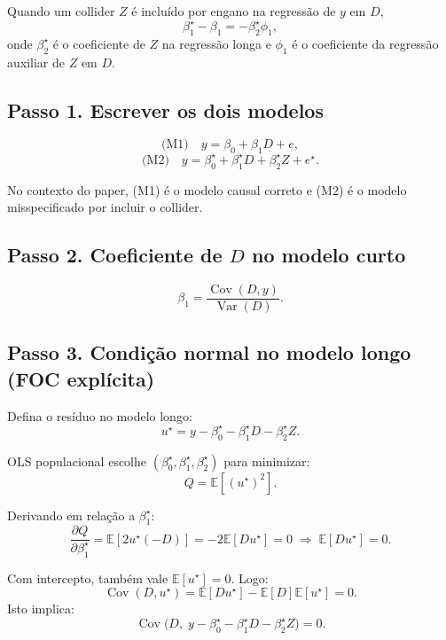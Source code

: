 \documentclass[
]{article}
\begin{document}
Quando um collider \(Z\) é incluído por engano na regressão de \(y\) em
\(D\), \[
\beta_1^\star - \beta_1 = -\beta_2^\star \phi_1,
\] onde \(\beta_2^\star\) é o coeficiente de \(Z\) na regressão longa e
\(\phi_1\) é o coeficiente da regressão auxiliar de \(Z\) em \(D\).

\subsection{Passo 1. Escrever os dois
modelos}\label{passo-1.-escrever-os-dois-modelos}

\[
\text{(M1)} \quad y = \beta_0 + \beta_1 D + e,
\] \[
\text{(M2)} \quad y = \beta_0^\star + \beta_1^\star D + \beta_2^\star Z + e^\star.
\]

No contexto do paper, (M1) é o modelo causal correto e (M2) é o modelo
misspecificado por incluir o collider.

\subsection{\texorpdfstring{Passo 2. Coeficiente de \(D\) no modelo
curto}{Passo 2. Coeficiente de D no modelo curto}}\label{passo-2.-coeficiente-de-d-no-modelo-curto}

\[
\beta_1 = \frac{\operatorname{Cov}(D,y)}{\operatorname{Var}(D)}.
\]

\subsection{Passo 3. Condição normal no modelo longo (FOC
explícita)}\label{passo-3.-condiuxe7uxe3o-normal-no-modelo-longo-foc-expluxedcita}

Defina o resíduo no modelo longo: \[
u^\star = y - \beta_0^\star - \beta_1^\star D - \beta_2^\star Z.
\]

OLS populacional escolhe \((\beta_0^\star,\beta_1^\star,\beta_2^\star)\)
para minimizar: \[
Q = \mathbb{E}\!\left[(u^\star)^2\right].
\]

Derivando em relação a \(\beta_1^\star\): \[
\frac{\partial Q}{\partial \beta_1^\star}
=
\mathbb{E}\!\left[2u^\star\left(-D\right)\right]
=
-2\mathbb{E}[Du^\star]=0
\;\Rightarrow\;
\mathbb{E}[Du^\star]=0.
\]

Com intercepto, também vale \(\mathbb{E}[u^\star]=0\). Logo: \[
\operatorname{Cov}(D,u^\star)=\mathbb{E}[Du^\star]-\mathbb{E}[D]\mathbb{E}[u^\star]=0.
\] Isto implica: \[
\operatorname{Cov}\!\big(D,\;y-\beta_0^\star-\beta_1^\star D-\beta_2^\star Z\big)=0.
\]
\end{document}
